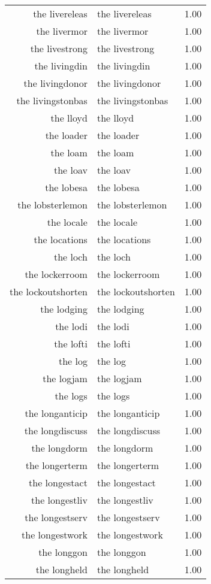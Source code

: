\begin{table}[ht]
\begin{tabular}{rlr}
  the livereleas & the livereleas & 1.00 \\ 
  the livermor & the livermor & 1.00 \\ 
  the livestrong & the livestrong & 1.00 \\ 
  the livingdin & the livingdin & 1.00 \\ 
  the livingdonor & the livingdonor & 1.00 \\ 
  the livingstonbas & the livingstonbas & 1.00 \\ 
  the lloyd & the lloyd & 1.00 \\ 
  the loader & the loader & 1.00 \\ 
  the loam & the loam & 1.00 \\ 
  the loav & the loav & 1.00 \\ 
  the lobesa & the lobesa & 1.00 \\ 
  the lobsterlemon & the lobsterlemon & 1.00 \\ 
  the locale & the locale & 1.00 \\ 
  the locations & the locations & 1.00 \\ 
  the loch & the loch & 1.00 \\ 
  the lockerroom & the lockerroom & 1.00 \\ 
  the lockoutshorten & the lockoutshorten & 1.00 \\ 
  the lodging & the lodging & 1.00 \\ 
  the lodi & the lodi & 1.00 \\ 
  the lofti & the lofti & 1.00 \\ 
  the log & the log & 1.00 \\ 
  the logjam & the logjam & 1.00 \\ 
  the logs & the logs & 1.00 \\ 
  the longanticip & the longanticip & 1.00 \\ 
  the longdiscuss & the longdiscuss & 1.00 \\ 
  the longdorm & the longdorm & 1.00 \\ 
  the longerterm & the longerterm & 1.00 \\ 
  the longestact & the longestact & 1.00 \\ 
  the longestliv & the longestliv & 1.00 \\ 
  the longestserv & the longestserv & 1.00 \\ 
  the longestwork & the longestwork & 1.00 \\ 
  the longgon & the longgon & 1.00 \\ 
  the longheld & the longheld & 1.00 \\ 

\end{tabular}
\end{table}

